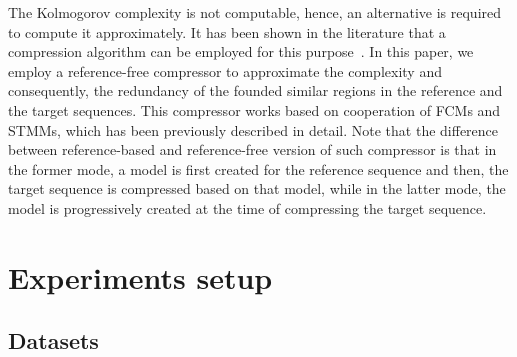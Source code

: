 \documentclass[a4paper,num-refs]{oup-contemporary}
\begin{document}
 The Kolmogorov complexity is not computable, hence, an alternative is required to compute it approximately. It has been shown in the literature that a compression algorithm can be employed for this purpose~\cite{zenil2015two,antao2018kolmogorov,faloutsos2007on}. In this paper, we employ a reference-free compressor to approximate the complexity and consequently, the redundancy of the founded similar regions in the reference and the target sequences. This compressor works based on cooperation of FCMs and STMMs, which has been previously described in detail. Note that the difference between reference-based and reference-free version of such compressor is that in the former mode, a model is first created for the reference sequence and then, the target sequence is compressed based on that model, while in the latter mode, the model is progressively created at the time of compressing the target sequence.


\section{Experiments setup} \label{sec.experiment}


\subsection{Datasets}
\end{document}
